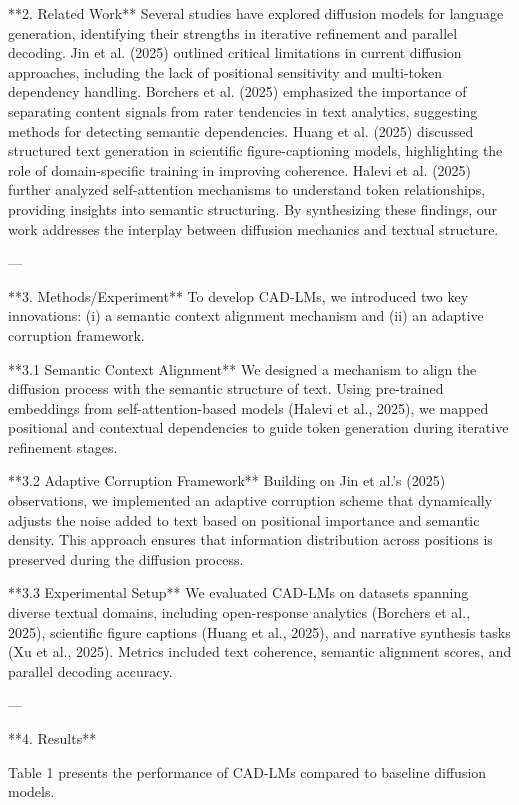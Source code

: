 **2. Related Work**  
Several studies have explored diffusion models for language generation, identifying their strengths in iterative refinement and parallel decoding. Jin et al. (2025) outlined critical limitations in current diffusion approaches, including the lack of positional sensitivity and multi-token dependency handling. Borchers et al. (2025) emphasized the importance of separating content signals from rater tendencies in text analytics, suggesting methods for detecting semantic dependencies. Huang et al. (2025) discussed structured text generation in scientific figure-captioning models, highlighting the role of domain-specific training in improving coherence. Halevi et al. (2025) further analyzed self-attention mechanisms to understand token relationships, providing insights into semantic structuring. By synthesizing these findings, our work addresses the interplay between diffusion mechanics and textual structure.

---

**3. Methods/Experiment**  
To develop CAD-LMs, we introduced two key innovations: (i) a semantic context alignment mechanism and (ii) an adaptive corruption framework.  

**3.1 Semantic Context Alignment**  
We designed a mechanism to align the diffusion process with the semantic structure of text. Using pre-trained embeddings from self-attention-based models (Halevi et al., 2025), we mapped positional and contextual dependencies to guide token generation during iterative refinement stages.

**3.2 Adaptive Corruption Framework**  
Building on Jin et al.’s (2025) observations, we implemented an adaptive corruption scheme that dynamically adjusts the noise added to text based on positional importance and semantic density. This approach ensures that information distribution across positions is preserved during the diffusion process.

**3.3 Experimental Setup**  
We evaluated CAD-LMs on datasets spanning diverse textual domains, including open-response analytics (Borchers et al., 2025), scientific figure captions (Huang et al., 2025), and narrative synthesis tasks (Xu et al., 2025). Metrics included text coherence, semantic alignment scores, and parallel decoding accuracy.

---

**4. Results**  

Table 1 presents the performance of CAD-LMs compared to baseline diffusion models.  

